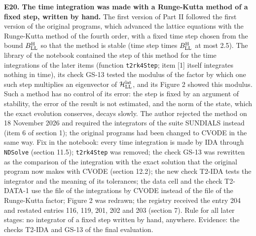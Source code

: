 \documentclass[
  10pt,
]{article}
\begin{document}
\textbf{E20. The time integration was made with a Runge-Kutta method of
a fixed step, written by hand.} The first version of Part II followed
the first version of the original programs, which advanced the lattice
equations with the Runge-Kutta method of the fourth order, with a fixed
time step chosen from the bound \(B^{\rm H}_{\rm LL}\) so that the
method is stable (time step times \(B^{\rm H}_{\rm LL}\) at most 2.5).
The library of the notebook contained the step of this method for the
time integrations of the later items (function \texttt{t2rk4Step}; item
{[}1{]} itself integrates nothing in time), its check GS-13 tested the
modulus of the factor by which one such step multiplies an eigenvector
of \(\mathcal H^{\rm lat}_{\rm LL}\), and its Figure 2 showed this
modulus. Such a method has no control of its error: the step is fixed by
an argument of stability, the error of the result is not estimated, and
the norm of the state, which the exact evolution conserves, decays
slowly. The author rejected the method on 18 November 2026 and required
the integrators of the suite SUNDIALS instead (item 6 of section 1); the
original programs had been changed to CVODE in the same way. Fix in the
notebook: every time integration is made by IDA through \texttt{NDSolve}
(section 11.5); \texttt{t2rk4Step} was removed; the check GS-13 was
rewritten as the comparison of the integration with the exact solution
that the original program now makes with CVODE (section 12.2); the new
check T2-IDA tests the integrator and the meaning of its tolerances; the
data cell and the check T2-DATA-1 use the file of the integrations by
CVODE instead of the file of the Runge-Kutta factor; Figure 2 was
redrawn; the registry received the entry 204 and restated entries 116,
119, 201, 202 and 203 (section 7). Rule for all later stages: no
integrator of a fixed step written by hand, anywhere. Evidence: the
checks T2-IDA and GS-13 of the final evaluation.
\end{document}
